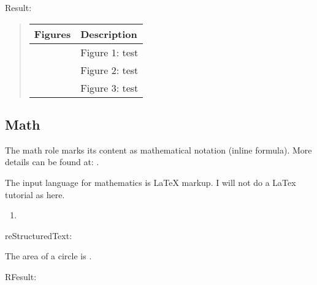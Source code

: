 \documentclass[letterpaper,12pt,english]{sphinxmanual}
\begin{document}
Result:
\begin{quote}


\begin{savenotes}\sphinxattablestart
\centering
\begin{tabulary}{\linewidth}[t]{|T|T|}
\hline
\sphinxstyletheadfamily 
Figures
&\sphinxstyletheadfamily 
Description
\\
\hline\begin{sphinxfigure-in-table}
\centering

\noindent{}
\end{sphinxfigure-in-table}\relax
&
Figure 1: test
\\
\hline
\noindent{}
&
Figure 2: test
\\
\hline
\noindent{}
&
Figure 3: test
\\
\hline
\end{tabulary}
\par
\sphinxattableend\end{savenotes}
\end{quote}


\subsection{Math}
\label{\detokenize{rtxt:math}}
The math role marks its content as mathematical notation (inline formula). More details can be found at: .

The input language for mathematics is LaTeX markup. I will not do a LaTex tutorial as here.
\begin{enumerate}
\def\theenumi{\arabic{enumi}}
\def\labelenumi{\theenumi .}
\makeatletter\def\p@enumii{\p@enumi \theenumi .}\makeatother
\item {} 

\end{enumerate}

reStructuredText:

\begin{sphinxVerbatim}[commandchars=\\\{\}]
The area of a circle is .
\end{sphinxVerbatim}

RFesult:
\end{document}
